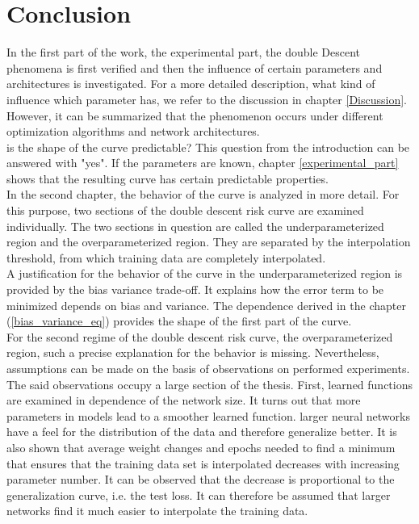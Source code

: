 \chapter{Conclusion}

In the first part of the work, the experimental part, the double Descent phenomena is first verified and then the influence of certain parameters and architectures is investigated. For a more detailed description, what kind of influence which parameter has, we refer to the discussion in chapter \ref{Discussion}.  However, it can be summarized that the phenomenon occurs under different optimization algorithms and network architectures. \\
 is the shape of the curve predictable? This question from the introduction can be answered with "yes". If the parameters are known, chapter \ref{experimental_part} shows that the resulting curve has certain predictable properties.\\ 
 In the second chapter, the behavior of the curve is analyzed in more detail. For this purpose, two sections of the double descent risk curve are examined individually. The two sections in question are called the underparameterized region and the overparameterized region. They are separated by the interpolation threshold, from which training data are completely interpolated. \\
A justification for the behavior of the curve in the underparameterized region is provided by the bias variance trade-off. It explains how the error term to be minimized depends on bias and variance. The dependence derived in the chapter (\ref{bias_variance_eq}) provides the shape of the first part of the curve. \\
For the second regime of the double descent risk curve, the overparameterized region, such a precise explanation for the behavior is missing. Nevertheless, assumptions can be made on the basis of observations on performed experiments. \\
The said observations occupy a large section of the thesis. First, learned functions are examined in dependence of the network size. It turns out that more parameters in models lead to a smoother learned function. larger neural networks have a feel for the distribution of the data and therefore generalize better.
It is also shown that average weight changes and epochs needed to find a minimum that ensures that the training data set is interpolated decreases with increasing parameter number. It can be observed that the decrease is proportional to the generalization curve, i.e. the test loss. It can therefore be assumed that larger networks find it much easier to interpolate the training data.\\

